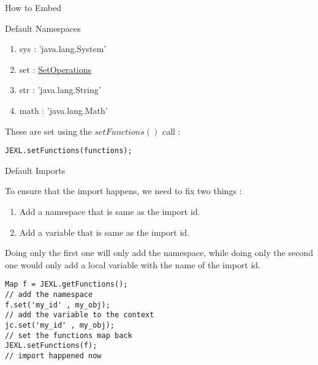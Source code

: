 \begin{section}{How to Embed}
\begin{subsection}{Default Namespaces}
\begin{enumerate}
\item{ sys : 'java.lang.System' }
\item{ set :  
  \href{https://github.com/nmondal/njexl/blob/master/lang/src/main/java/com/noga/njexl/lang/extension/SetOperations.java}{SetOperations} 
}
\item{ str : 'java.lang.String' }
\item{ math : 'java.lang.Math' }
\end{enumerate}

These are set using the $setFunctions()$ call :

\begin{lstlisting}[style=myJavaStyle]
JEXL.setFunctions(functions);
\end{lstlisting} 

\end{subsection}

\begin{subsection}{Default Imports}

To ensure that the import happens, we need to 
fix two things :
\begin{enumerate}
\item{Add a namespace that is same as the import id. }
\item{Add a variable that is same as the import id. }
\end{enumerate}

Doing only the first one will only add the namespace,
while doing only the second one would only add a local 
variable with the name of the import id.

\begin{lstlisting}[style=myJavaStyle]
Map f = JEXL.getFunctions();
// add the namespace 
f.set('my_id' , my_obj);
// add the variable to the context 
jc.set('my_id' , my_obj);
// set the functions map back 
JEXL.setFunctions(f);
// import happened now 
\end{lstlisting} 


\end{subsection}

\end{section}

